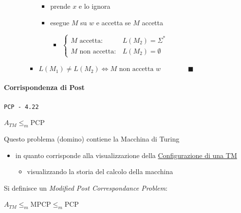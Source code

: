 \documentclass[
                        12pt, %
                        a4paper, %
                        oneside, %
                        headinclude,footinclude, %
                        BCOR5mm, %
                  ]{scrartcl}
\begin{document}
\begin{enumerate}
\begin{itemize}
\begin{itemize}
\begin{itemize}
\item prende \(x\) e lo ignora
\item esegue \(M\) su \(w\) e accetta se \(M\) accetta
\begin{itemize}
\item \(\begin{cases} M \mbox{ accetta}: & L(M_{2})=\Sigma^{*}\\M \mbox{ non accetta}: & L(M_{2}) = \emptyset  \end{cases}\)
\end{itemize}
\end{itemize}
\item \(L(M_{1}) \neq L(M_{2}) \iff M \mbox{ non accetta }w \qquad\qquad \blacksquare\)
\end{itemize}
\end{itemize}
\end{enumerate}

\paragraph{Corrispondenza di Post}
\label{sec:org551e826}
\texttt{PCP - 4.22}

\(A_{TM} \le_{m} \text{PCP}\)

Questo problema (domino) contiene la Macchina di Turing
\begin{itemize}
\item in quanto corrisponde alla visualizzazione della \hyperref[sec:org38b686c]{Configurazione di una TM}
\begin{itemize}
\item visualizzando la storia del calcolo della macchina
\end{itemize}
\end{itemize}

Si definisce un \emph{Modified Post Correspondance Problem}:

\(A_{TM} \le_{m} \text{MPCP} \le_{m} \text{PCP}\)
\end{document}
